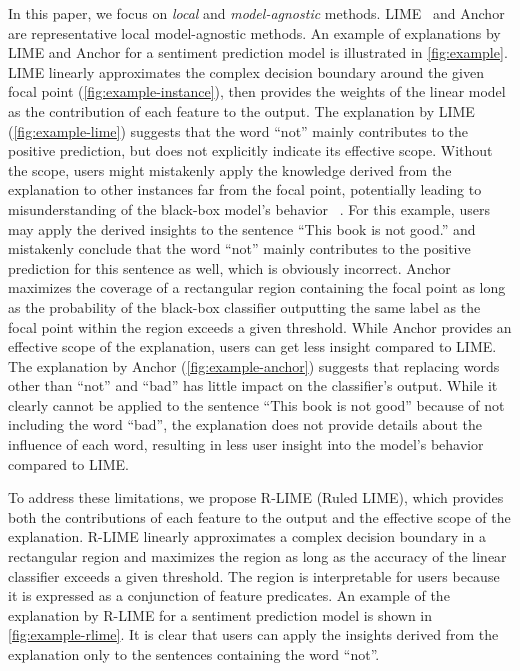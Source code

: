 \documentclass[runningheads]{llncs}
\begin{document}
{In this paper,
we focus on \emph{local} and \emph{model-agnostic} methods.
LIME~\cite{ribeiro2016why} and Anchor~\cite{ribeiro2018anchors}
are representative local model-agnostic methods.
An example of explanations by LIME and Anchor
for a sentiment prediction model is illustrated in \cref{fig:example}.
LIME linearly approximates the complex decision boundary
around the given focal point (\cref{fig:example-instance}),
then provides the weights of the linear model as the contribution of each feature
to the output.
The explanation by LIME (\cref{fig:example-lime}) suggests that
the word ``not'' mainly contributes to the positive prediction,
but does not explicitly indicate its effective scope.
Without the scope,
users might mistakenly apply the knowledge derived from the explanation
to other instances far from the focal point,
potentially leading to misunderstanding of the black-box model's behavior
~\cite{ribeiro2018anchors}.
For this example,
users may apply the derived insights
to the sentence ``This book is not good.'' %
and mistakenly conclude that the word ``not''
mainly contributes to the positive prediction for this sentence as well,
which is obviously incorrect.
Anchor maximizes the coverage of a rectangular region containing the focal point
as long as the probability of the black-box classifier outputting
the same label as the focal point within the region exceeds a given threshold.
While Anchor provides an effective scope of the explanation,
users can get less insight compared to LIME\@.
The explanation by Anchor (\cref{fig:example-anchor})
suggests that replacing words other than ``not'' and ``bad''
has little impact on the classifier's output.
While it clearly cannot be applied to the sentence ``This book is not good''
because of not including the word ``bad'',
the explanation does not provide details about the influence of each word,
resulting in less user insight into the model's behavior compared to LIME\@.

To address these limitations,
we propose R-LIME (Ruled LIME),
which provides both the contributions of each feature to the output
and the effective scope of the explanation.
R-LIME linearly approximates a complex decision boundary
in a rectangular region and maximizes the region
as long as the accuracy of the linear classifier exceeds a given threshold.
The region is interpretable for users because it is
expressed as a conjunction of feature predicates.
An example of the explanation by R-LIME for a sentiment prediction model
is shown in \cref{fig:example-rlime}.
It is clear that users can apply the insights derived from the explanation
only to the sentences containing the word ``not''.

}
\end{document}
